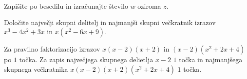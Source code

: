 \documentclass[addpoints]{exam}
\begin{document}
\begin{questions}

    
    
    \question
    Zapišite po besedilu in izračunajte število $w$ oziroma $z$.




    \question[4]
    Določite največji skupni delitelj in najmanjši skupni večkratnik izrazov $x^3-4x^2+3x$ in $x(x^2-6x+9)$.

    \begin{solution}[4cm]
        Za pravilno faktorizacijo izrazov $x(x-2)(x+2)$ in $(x-2)(x^2+2x+4)$ po $1$ točka. 
        Za zapis največjega skupnega delietlja $x-2$ $1$ točka in najmanjšega skupnega večkratnika $x(x-2)(x+2)(x^2+2x+4)$ $1$ točka.
    \end{solution}
    




     \newpage

    

\end{questions}
\end{document}
